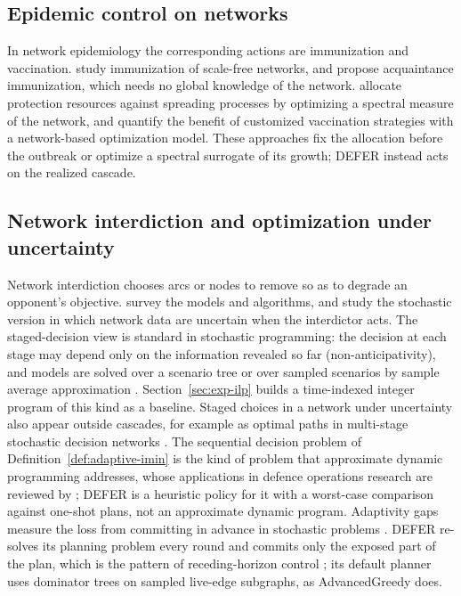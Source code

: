 \documentclass[11pt]{article}
\theoremstyle{definition}
\theoremstyle{remark}
\begin{document}
\subsection{Epidemic control on networks}

In network epidemiology the corresponding actions are immunization and vaccination. \citet{pastor2002} study immunization of scale-free networks, and \citet{cohen2003} propose acquaintance immunization, which needs no global knowledge of the network. \citet{preciado2014} allocate protection resources against spreading processes by optimizing a spectral measure of the network, and \citet{li2024} quantify the benefit of customized vaccination strategies with a network-based optimization model. These approaches fix the allocation before the outbreak or optimize a spectral surrogate of its growth; DEFER instead acts on the realized cascade.

\subsection{Network interdiction and optimization under uncertainty}

Network interdiction chooses arcs or nodes to remove so as to degrade an opponent's objective. \citet{smith2020} survey the models and algorithms, and \citet{cormican1998} study the stochastic version in which network data are uncertain when the interdictor acts. The staged-decision view is standard in stochastic programming: the decision at each stage may depend only on the information revealed so far (non-anticipativity), and models are solved over a scenario tree \citep{birge2011} or over sampled scenarios by sample average approximation \citep{kleywegt2002}. Section~\ref{sec:exp-ilp} builds a time-indexed integer program of this kind as a baseline. Staged choices in a network under uncertainty also appear outside cascades, for example as optimal paths in multi-stage stochastic decision networks \citep{roohnavazfar2019}. The sequential decision problem of Definition~\ref{def:adaptive-imin} is the kind of problem that approximate dynamic programming addresses, whose applications in defence operations research are reviewed by \citet{rempel2021}; DEFER is a heuristic policy for it with a worst-case comparison against one-shot plans, not an approximate dynamic program. Adaptivity gaps measure the loss from committing in advance in stochastic problems \citep{deangoemansvondrak2008,gupta2016}. DEFER re-solves its planning problem every round and commits only the exposed part of the plan, which is the pattern of receding-horizon control \citep{mayne2000}; its default planner uses dominator trees \citep{lengauer1979} on sampled live-edge subgraphs, as AdvancedGreedy does.
\end{document}
